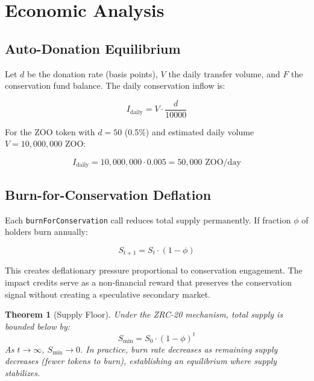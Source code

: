 \documentclass[11pt,letterpaper]{article}
\newtheorem{theorem}{Theorem}[section]
\begin{document}
\section{Economic Analysis}
\label{sec:economics}

\subsection{Auto-Donation Equilibrium}

Let $d$ be the donation rate (basis points), $V$ the daily transfer volume, and $F$ the conservation fund balance. The daily conservation inflow is:

\begin{equation}
I_{\text{daily}} = V \cdot \frac{d}{10000}
\end{equation}

For the ZOO token with $d = 50$ (0.5\%) and estimated daily volume $V = 10{,}000{,}000$ ZOO:

\begin{equation}
I_{\text{daily}} = 10{,}000{,}000 \cdot 0.005 = 50{,}000 \text{ ZOO/day}
\end{equation}

\subsection{Burn-for-Conservation Deflation}

Each \texttt{burnForConservation} call reduces total supply permanently. If fraction $\phi$ of holders burn annually:

\begin{equation}
S_{t+1} = S_t \cdot (1 - \phi)
\end{equation}

This creates deflationary pressure proportional to conservation engagement. The impact credits serve as a non-financial reward that preserves the conservation signal without creating a speculative secondary market.

\begin{theorem}[Supply Floor]
Under the ZRC-20 mechanism, total supply is bounded below by:
\begin{equation}
S_{\min} = S_0 \cdot (1-\phi)^t
\end{equation}
As $t \to \infty$, $S_{\min} \to 0$. In practice, burn rate decreases as remaining supply decreases (fewer tokens to burn), establishing an equilibrium where supply stabilizes.
\end{theorem}
\end{document}
